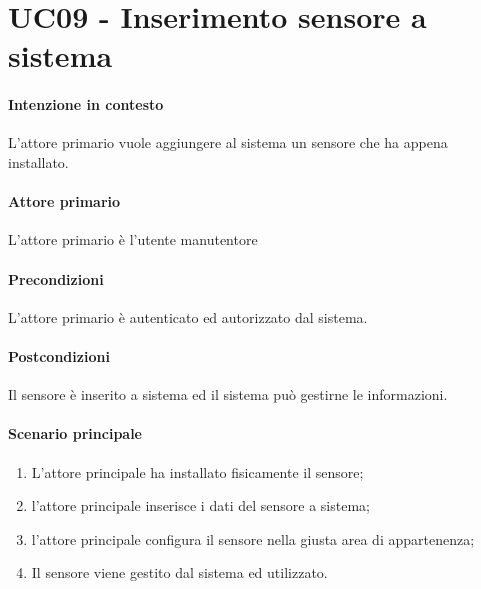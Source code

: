 \section{UC09 - Inserimento sensore a sistema}\label{uc:09}

\paragraph{Intenzione in contesto} L'attore primario vuole aggiungere al sistema un sensore che ha appena installato.

\paragraph{Attore primario} L'attore primario è l'utente manutentore

\paragraph{Precondizioni} L'attore primario è autenticato ed autorizzato dal sistema.

\paragraph{Postcondizioni} Il sensore è inserito a sistema ed il sistema può gestirne le informazioni.

\paragraph{Scenario principale}

\begin{enumerate}
    \item L'attore principale ha installato fisicamente il sensore;
    \item l'attore principale inserisce i dati del sensore a sistema;
    \item l'attore principale configura il sensore nella giusta area di appartenenza;
    \item Il sensore viene gestito dal sistema ed utilizzato.
\end{enumerate}

